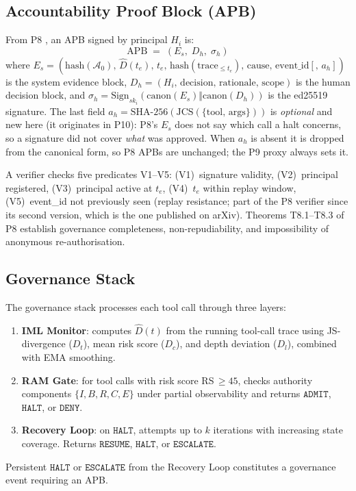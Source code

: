\documentclass[11pt]{article}
\newcommand{\Azero}{\mathcal{A}_0}
\newcommand{\Dhat}{\widehat{D}}
\newcommand{\HALT}{\texttt{HALT}}
\newcommand{\RESUME}{\texttt{RESUME}}
\newcommand{\DENY}{\texttt{DENY}}
\newcommand{\ADMIT}{\texttt{ADMIT}}
\newcommand{\Es}{E_s}
\newcommand{\ahash}{a_h}   %
\newcommand{\Dh}{D_h}
\newcommand{\sigh}{\sigma_h}
\newcommand{\Hi}{H_i}
\newcommand{\ski}{sk_i}
\newcommand{\APB}{\mathrm{APB}}
\begin{document}
\subsection{Accountability Proof Block (APB)}

From P8 \citep{fernandez2026ibg}, an APB signed by principal $\Hi$ is:
\[
  \APB \;=\; (\Es,\;\Dh,\;\sigh)
\]
where $\Es = (\mathrm{hash}(\Azero),\,\Dhat(t_e),\,t_e,\,
\mathrm{hash}(\text{trace}_{\le t_e}),\,\text{cause},\,\text{event\_id}
[,\,\ahash])$
is the system evidence block, $\Dh = (\Hi,\,\text{decision},\,
\text{rationale},\,\text{scope})$ is the human decision block,
and $\sigh = \mathrm{Sign}_{\ski}(\mathrm{canon}(\Es) \Vert
\mathrm{canon}(\Dh))$ is the ed25519 signature. The last field
$\ahash = \mathrm{SHA\text{-}256}(\mathrm{JCS}(\{\text{tool},\,\text{args}\}))$
is \emph{optional} and new here (it originates in P10): P8's $\Es$ does not say
which call a halt concerns, so a signature did not cover \emph{what}
was approved. When $\ahash$ is absent it is dropped from the canonical
form, so P8 APBs are unchanged; the P9 proxy always sets it.

A verifier checks five predicates V1--V5: (V1)~signature validity,
(V2)~principal registered, (V3)~principal active at $t_e$,
(V4)~$t_e$ within replay window, (V5)~event\_id not previously seen
(replay resistance; part of the P8 verifier since its second version,
which is the one published on arXiv).
Theorems T8.1--T8.3 of P8 establish governance completeness,
non-repudiability, and impossibility of anonymous re-authorisation.

\subsection{Governance Stack}

The governance stack processes each tool call through three layers:
\begin{enumerate}[leftmargin=2em, topsep=2pt, itemsep=1pt]
  \item \textbf{IML Monitor}: computes $\Dhat(t)$ from the running
        tool-call trace using JS-divergence ($D_t$), mean risk score
        ($D_c$), and depth deviation ($D_l$), combined with EMA
        smoothing.
  \item \textbf{RAM Gate}: for tool calls with risk score RS\,$\ge 45$,
        checks authority components $\{I, B, R, C, E\}$ under partial
        observability and returns $\ADMIT$, $\HALT$, or $\DENY$.
  \item \textbf{Recovery Loop}: on $\HALT$, attempts up to $k$
        iterations with increasing state coverage.
        Returns $\RESUME$, $\HALT$, or $\texttt{ESCALATE}$.
\end{enumerate}
Persistent $\HALT$ or $\texttt{ESCALATE}$ from the Recovery Loop
constitutes a governance event requiring an APB.
\end{document}
